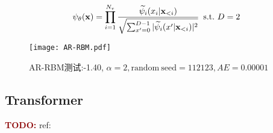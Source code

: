 \begin{equation}
    \psi_{\theta}(\mathbf{x}) = \prod_{i=1}^{N_v}\frac{\widetilde{\psi}_i(x_i|\mathbf{x}_{<i})}
    {\sqrt{\sum_{x^\prime = 0}^{D-1}\vert \widetilde{\psi}_i(x^\prime |\mathbf{x}_{<i})\vert^2}}
    \enskip \mathrm{s.t.} ~ D = 2
\end{equation}

\begin{figure}[htp]
    \centering
    \texttt{[image: AR-RBM.pdf]}
    \caption{AR-RBM测试:-1.40, $\alpha = 2, \mathrm{random\ seed} = 112123, AE= 0.00001$}
\end{figure}

\subsection{Transformer}
\textcolor{darkred}{\textbf{TODO:}} ref:\cite{zhang2023transformer,wu2023nnqs}
